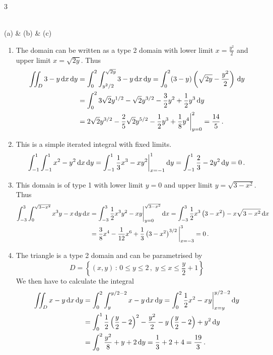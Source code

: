\begin{solution}
\begin{center}
\begin{figuretable}{3}
\\
(a) & (b) & (c)
\end{figuretable}
\end{center}

\begin{enumerate}
\item
The domain can be written as a type 2 domain with lower limit $x=\frac{y^2}2$ and upper limit $x = \sqrt{2y}$. Thus
\begin{align*}
\iint_D 3-y \,\mathrm{d} x \,\mathrm{d} y
&= \int_0^2 \int_{y^2/2}^{\sqrt{2y}} 3-y \,\mathrm{d} x \,\mathrm{d} y
= \int_0^2 (3-y)\left(\sqrt{2y} - \frac{y^2}{2} \right) \,\mathrm{d} y \\
&= \int_0^2 3\sqrt 2 y^{1/2} - \sqrt 2 y^{3/2} - \frac 32 y^2 + \frac 12 y^3 \,\mathrm{d} y \\
&= 2 \sqrt 2 y^{3/2} - \frac 25 \sqrt 2 y^{5/2} - \frac 12 y^3 + \frac 18 y^4 \bigg|_{y=0}^2
= \frac {14}5\,.
\end{align*}
\item
This is a simple iterated integral with fixed limits.
\[
\int_{-1}^1 \int_{-1}^1 x^2 - y^2 \,\mathrm{d} x \,\mathrm{d} y
= \int_{-1}^1 \frac 13 x^3 - xy^2 \bigg|_{x=-1}^1 \,\mathrm{d} y
= \int_{-1}^1 \frac 23 - 2y^2 \,\mathrm{d} y = 0\,.
\]
\item
This domain is of type 1 with lower limit $y=0$ and upper limit $y=\sqrt{3-x^2}$. Thus
\begin{align*}
\int_{-3}^3 \int_0^{\sqrt{3-x^2}} x^3 y - x \,\mathrm{d} y \,\mathrm{d} x
&= \int_{-3}^3 \frac 12 x^3 y^2 - xy \bigg|_{y=0}^{\sqrt{3-x^2}} \,\mathrm{d} x
= \int_{-3}^3 \frac 12 x^3 \left(3-x^2 \right) - x \sqrt{3-x^2} \,\mathrm{d} x \\
&= \frac 38 x^4 - \frac 1{12}x^6 + \frac 13 \left(3-x^2\right)^{3/2} \bigg|_{x=-3}^3
=0 \,.
\end{align*}
\item
The triangle is a type 2 domain and can be parametrised by
\[
D = \left\{ (x,y) \,:\, 0 \leq y \leq 2\,,\; y \leq x \leq \frac y2+1 \right\}
\]
We then have to calculate the integral
\begin{align*} 
\iint_D x-y \,\mathrm{d} x \,\mathrm{d} y
&= \int_0^2 \int_{y}^{y/2-2} x-y \,\mathrm{d} x \,\mathrm{d} y 
= \int_0^2 \frac 12 x^2 - xy \bigg|_{x=y}^{y/2-2} \,\mathrm{d} y \\
&= \int_0^1 \frac 12 \left(\frac y2-2\right)^2 - \frac {y^2}{2} - y\left(\frac y2-2\right) + y^2 \,\mathrm{d} y \\
&= \int_0^2 \frac{y^2}8 + y + 2 \,\mathrm{d} y
= \frac 13 + 2 + 4 = \frac {19}3 \,.
\end{align*}

\end{enumerate}
\end{solution}
